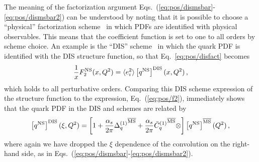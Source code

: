 The  meaning of the factorization argument
Eqs.~(\ref{eq:pos/dismsbar}-\ref{eq:pos/dismsbar2}) can be understood by
noting
that it is possible to choose a ``physical'' factorization
scheme~\cite{Catani:1995ze} in which PDFs are identified with physical
observables. This means that the coefficient function is set to one to
all orders by scheme choice. An example is the ``DIS'' scheme~\cite{Diemoz:1987xu} in which
the quark PDF is identified with the DIS structure function, so that
Eq.~\ref{eq:pos/disfact} becomes
\begin{equation}\label{eq:pos/disfactns}
 \frac{1}{x} F_2^{{\textrm{NS}}}(x,Q^2)= \langle e_i^2\rangle  \left[{q^{{\textrm{NS}}}}\right]^{\textrm{DIS}}(x,Q^2) \,,
 \end{equation}
which holds to all perturbative orders. Comparing this DIS scheme
expression of the structure function to the \msbar{} expression,
Eq.~(\ref{eq:pos/f2}), immediately shows that the quark PDF in the DIS
and \msbar{} schemes are related by
\begin{equation}\label{eq:pos/msbartodis}
\left[{q^{{\textrm{NS}}}}\right]^{\textrm{DIS}}(\xi,Q^2)=
\left[1+\frac{\alpha_s}{2\pi} {\Delta^{(1)}_q}^{{\overline{\textrm{MS}}}}
  +\frac{\alpha_s}{2\pi}
  {{{\bar{C}}^{(1)}}_q{}}^{{\overline{\textrm{MS}}}}\otimes\right]\left[{q^{{\textrm{NS}}}}\right]^{{\overline{\textrm{MS}}}}(Q^2) \,,
\end{equation}
where again we have dropped the $\xi$ dependence of the convolution
on the right-hand side,
as in Eqs.~(\ref{eq:pos/dismsbar}-\ref{eq:pos/dismsbar2}).

